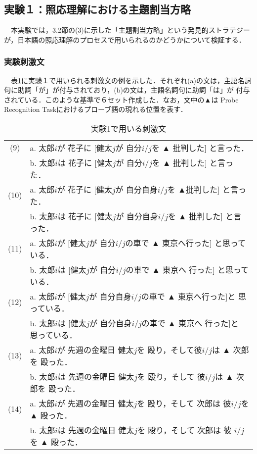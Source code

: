 \subsection{実験１：照応理解における主題割当方略}
　本実験では，3.2節の(3)に示した「主題割当方略」という発見的ストラテジー
が，日本語の照応理解のプロセスで用いられるのかどうかについて検証する．

\subsubsection{実験刺激文}

　表\ref{table:exam1s}に実験１で用いられる刺激文の例を示した．それぞれ(a)の文は，主語名詞句に助詞「が」が付与されており，(b)の文は，主語名詞句に助詞「は」が
付与されている．このような基準で６セット作成した．なお，文中の▲は
Probe Recognition Taskにおけるプローブ語の現れる位置を表す．

\begin{table}[htbp]
\begin{center}
\caption{実験1で用いる刺激文}
\label{table:exam1s}
\begin{tabular}{cl}\hline
(9)& a. 太郎$i$が 花子に [健太$j$が 自分$i/j$を ▲ 批判した] と言った．\\
   & b. 太郎$i$は 花子に [健太$j$が 自分$i/j$を ▲ 批判した] と言った．\\
(10)& a. 太郎$i$が 花子に [健太$j$が 自分自身$i/j$を ▲批判した] と言った．\\
    & b. 太郎$i$は 花子に [健太$j$が 自分自身$i/j$を ▲ 批判した] と言った．\\
(11)& a. 太郎$i$が [健太$j$が 自分$i/j$の車で ▲ 東京へ行った] と思っている．\\
    & b. 太郎$i$は [健太$j$が 自分$i/j$の車で ▲ 東京へ 行った] と思っている．\\
(12)& a. 太郎$i$が [健太$j$が 自分自身$i/j$の車で ▲ 東京へ行った]と 思っている．\\
    & b. 太郎$i$は [健太$j$が 自分自身$i/j$の車で ▲ 東京へ 行った]と 思っている．\\
(13)& a. 太郎$i$が 先週の金曜日 健太$j$を 殴り，そして彼$i/j$は ▲ 次郎を 殴った．\\
    & b. 太郎$i$は 先週の金曜日 健太$j$を 殴り，そして 彼$i/j$は ▲ 次郎を 殴った．\\
(14)& a. 太郎$i$が 先週の金曜日 健太$j$を 殴り，そして 次郎は 彼$i/j$を ▲ 殴った．\\
    & b. 太郎$i$は 先週の金曜日 健太$j$を 殴り，そして 次郎は 彼
   $i/j$を ▲ 殴った．\\ \hline
\end{tabular}
\end{center}
\end{table}


